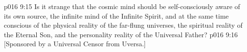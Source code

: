 \vs p016 9:15 Is it strange that the cosmic mind should be self\hyp{}consciously aware of its own source, the infinite mind of the Infinite Spirit, and at the same time conscious of the physical reality of the far\hyp{}flung universes, the spiritual reality of the Eternal Son, and the personality reality of the Universal Father?
\vsetoff
\vs p016 9:16 [Sponsored by a Universal Censor from Uversa.]
\quizlink
{}
